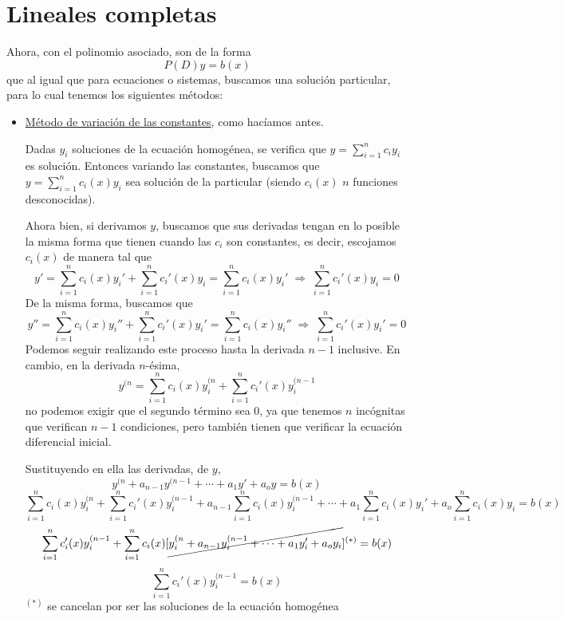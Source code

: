 \section{Lineales completas}
Ahora, con el polinomio asociado, son de la forma 
$$P(D)y=b(x)$$
que al igual que para ecuaciones o sistemas, buscamos una solución particular, para lo cual tenemos los siguientes métodos:
\begin{itemize}
    \item \underline{Método de variación de las constantes}, como hacíamos antes. 
    
    Dadas $y_i$ soluciones de la ecuación homogénea, se verifica que $\displaystyle 
    y=\sum_{i=1}^n c_i y_i $ es solución. Entonces variando las constantes, buscamos que $\displaystyle y=\sum_{i=1}^n c_i(x) y_i $ sea solución de la particular (siendo $c_i(x)$ $n$ funciones desconocidas).

    Ahora bien, si derivamos $y$, buscamos que sus derivadas tengan en lo posible la misma forma que tienen cuando las $c_i$ son constantes, es decir, escojamos $c_i(x)$ de manera tal que 
    $$y'=\sum_{i=1}^n c_i(x) y_i' +\sum_{i=1}^n c_i'(x) y_i =\sum_{i=1}^n c_i(x) y_i' \; \Rightarrow \;  \sum_{i=1}^n c_i'(x) y_i = 0$$
    De la misma forma, buscamos que 
    $$y''=\sum_{i=1}^n c_i(x) y_i'' +\sum_{i=1}^n c_i'(x) y_i'  =\sum_{i=1}^n c_i(x) y_i''  \; \Rightarrow \;  \sum_{i=1}^n c_i'(x) y_i' = 0 $$
    Podemos seguir realizando este proceso hasta la derivada $n-1$ inclusive. En cambio, en la derivada $n$-ésima,
    $$y^{(n}=\sum_{i=1}^n c_i(x) y_i^{(n} +\sum_{i=1}^n c_i'(x) y_i^{(n-1} $$
    no podemos exigir que el segundo término sea 0, ya que tenemos $n$ incógnitas que verifican $n-1$ condiciones, pero también tienen que verificar la ecuación diferencial inicial. 

    Sustituyendo en ella las derivadas, de $y$, 
    $$y^{(n}+a_{n-1}y^{(n-1} + \cdots + a_{1}y' + a_o y = b(x) $$
    $$\sum_{i=1}^n c_i(x) y_i^{(n} +\sum_{i=1}^n c_i'(x) y_i^{(n-1}  + a_{n-1} \sum_{i=1}^n c_i(x) y_i^{(n-1}  + \cdots + a_1 \sum_{i=1}^n c_i(x) y_i' + a_o \sum_{i=1}^n c_i(x) y_i = b(x)  $$
    $$\sum_{i=1}^n c_i'(x) y_i^{(n-1} + \sum_{i=1}^n c_i(x) [\cancel{y_i^{(n} + a_{n-1}  y_i^{(n-1}  + \cdots + a_1  y_i' + a_o  y_i}] ^{(*)} = b(x) $$
    $$\sum_{i=1}^n c_i'(x) y_i^{(n-1}  = b(x)$$
    $^{(*)}$ se cancelan por ser las soluciones de la ecuación homogénea


\end{itemize}

